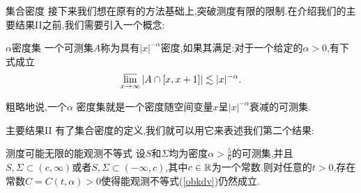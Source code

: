 \iffalse
\begin{frame}[t]
  The strategy to prove (\ref{7}) is to construct the operator
  \begin{equation}\label{8}
    Tf := \chi_{S}S(-t)\left( \chi_{\Sigma}S(t)f \right).  
  \end{equation}
  and claim that $T$ is a compact operator and $\|T\|<1$.

 \begin{equation}
   Tf(x)=\int \chi_{S}(x)\left( \int E(-t,x-w)\chi_\Sigma(w) E(t,w-y)\,\mathrm{d}w \right) f(y)\,\mathrm{d}y.
 \end{equation}
 Define $K(x,y)=\chi_S(x)\int E(-t,x-w)\chi_{\Sigma}(w)E(t,w-y)\,\mathrm{d}w $. Then 
\begin{equation}
  Tf(x)= \int K(x,y)f(y)\,\mathrm{d}y.
\end{equation}

\end{frame}
\fi
\begin{frame}[t]{集合密度}
  接下来我们想在原有的方法基础上,突破测度有限的限制.在介绍我们的主要结果II之前,我们需要引入一个概念:
  \begin{block}{$\alpha$密度集}
    一个可测集$A$称为具有$|x|^{-\alpha}$密度,如果其满足:对于一个给定的$\alpha>0$,有下式成立
    \begin{equation}
      \varlimsup_{x\to \infty}|A\cap [x,x+1]|\lesssim|x|^{-\alpha}.
    \end{equation}
  \end{block}
  粗略地说,一个$\alpha$ 密度集就是一个密度随空间变量$x$呈$|x|^{-\alpha}$衰减的可测集.
\end{frame}

\begin{frame}[t]{主要结果II}
  有了集合密度的定义,我们就可以用它来表述我们第二个结果:
  \begin{alertblock}{测度可能无限的能观测不等式}
    设$S$和$\Sigma$均为密度$\alpha>\frac{5}{6}$的可测集,并且$S,\Sigma \subset (c,\infty)$或者$S,\Sigma\subset (-\infty,c)$,其中$c\in \mathbb{R}$为一个常数.则对任意的$t>0$,存在常数$C=C(t,\alpha)>0$使得能观测不等式(\ref{obkdv})仍然成立.
  \end{alertblock}
\end{frame}

